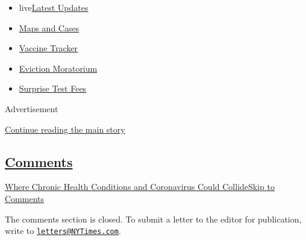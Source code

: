 \begin{itemize}
\tightlist
\item
  live\href{https://www.nytimes3xbfgragh.onion/2020/09/09/world/covid-19-coronavirus.html?name=styln-coronavirus-national\&region=TOP_BANNER\&block=storyline_menu_recirc\&action=click\&pgtype=Interactive\&impression_id=9ff1cc00-f2a9-11ea-b26b-4f4bf8e5c9c3\&variant=undefined}{Latest
  Updates}
\item
  \href{https://www.nytimes3xbfgragh.onion/interactive/2020/us/coronavirus-us-cases.html?name=styln-coronavirus-national\&region=TOP_BANNER\&block=storyline_menu_recirc\&action=click\&pgtype=Interactive\&impression_id=9ff1cc01-f2a9-11ea-b26b-4f4bf8e5c9c3\&variant=undefined}{Maps
  and Cases}
\item
  \href{https://www.nytimes3xbfgragh.onion/interactive/2020/science/coronavirus-vaccine-tracker.html?name=styln-coronavirus-national\&region=TOP_BANNER\&block=storyline_menu_recirc\&action=click\&pgtype=Interactive\&impression_id=9ff1cc02-f2a9-11ea-b26b-4f4bf8e5c9c3\&variant=undefined}{Vaccine
  Tracker}
\item
  \href{https://www.nytimes3xbfgragh.onion/2020/09/02/your-money/eviction-moratorium-covid.html?name=styln-coronavirus-national\&region=TOP_BANNER\&block=storyline_menu_recirc\&action=click\&pgtype=Interactive\&impression_id=9ff1cc03-f2a9-11ea-b26b-4f4bf8e5c9c3\&variant=undefined}{Eviction
  Moratorium}
\item
  \href{https://www.nytimes3xbfgragh.onion/2020/09/09/upshot/coronavirus-surprise-test-fees.html?name=styln-coronavirus-national\&region=TOP_BANNER\&block=storyline_menu_recirc\&action=click\&pgtype=Interactive\&impression_id=9ff1cc04-f2a9-11ea-b26b-4f4bf8e5c9c3\&variant=undefined}{Surprise
  Test Fees}
\end{itemize}

Advertisement

\protect\hyperlink{after-top}{Continue reading the main story}

\hypertarget{comments}{%
\subsection{\texorpdfstring{\protect\hyperlink{commentsContainer}{Comments}}{Comments}}\label{comments}}

\href{}{Where Chronic Health Conditions and Coronavirus Could
Collide}\href{}{Skip to Comments}

The comments section is closed. To submit a letter to the editor for
publication, write to
\href{mailto:letters@NYTimes.com}{\nolinkurl{letters@NYTimes.com}}.


